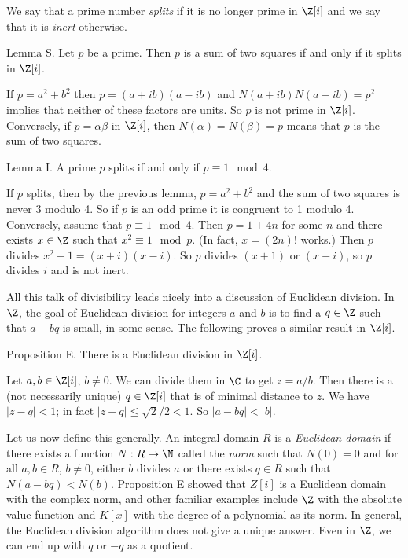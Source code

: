 We say that a prime number {\it splits} if it is no longer prime in $\Z[i]$ and we say that it is {\it inert} otherwise.

\proclaim Lemma S. Let $p$ be a prime. Then $p$ is a sum of two squares if and only if it splits in $\Z[i]$.

\proof If $p = a^2 + b^2$ then $p = (a + ib)(a-ib)$ and $N(a+ib)N(a-ib) = p^2$ implies that neither of these factors are units. So $p$ is not prime in $\Z[i]$. Conversely, if $p = \alpha\beta$ in $\Z[i]$, then $N(\alpha) = N(\beta) = p$ means that $p$ is the sum of two squares.\slug

\proclaim Lemma I. A prime $p$ splits if and only if $p\equiv 1 \mod 4$.

\proof If $p$ splits, then by the previous lemma, $p = a^2 + b^2$ and the sum of two squares is never $3$ modulo 4. So if $p$ is an odd prime it is congruent to 1 modulo 4. Conversely, assume that $p\equiv 1\mod 4$. Then $p = 1 + 4n$ for some $n$ and there exists $x\in \Z$ such that $x^2 \equiv 1\mod p$. (In fact, $x = (2n)!$ works.) Then $p$ divides $x^2 + 1 = (x+i)(x-i)$. So $p$ divides $(x+1)$ or $(x-i)$, so $p$ divides $i$ and is not inert.\slug

All this talk of divisibility leads nicely into a discussion of Euclidean division. In $\Z$, the goal of Euclidean division for integers $a$ and $b$ is to find a $q\in \Z$ such that $a-bq$ is small, in some sense. The following proves a similar result in $\Z[i]$.

\proclaim Proposition E. There is a Euclidean division in $\Z[i]$.

\proof Let $a,b\in \Z[i]$, $b\neq 0$. We can divide them in $\C$ to get $z = a/b$. Then there is a (not necessarily unique) $q\in \Z[i]$ that is of minimal distance to $z$. We have $|z-q|<1$; in fact $|z-q| \leq \sqrt{2}/2 < 1$. So $|a-bq| < |b|$.\slug

Let us now define this generally. An integral domain $R$ is a {\it Euclidean domain} if there exists a function $N : R\to \N$ called the {\it norm} such that $N(0) = 0$ and for all $a,b\in R$, $b\neq 0$, either $b$ divides $a$ or there exists $q\in R$ such that $N(a-bq) < N(b)$. Proposition E showed that $Z[i]$ is a Euclidean domain with the complex norm, and other familiar examples include $\Z$ with the absolute value function and $K[x]$ with the degree of a polynomial as its norm. In general, the Euclidean division algorithm does not give a unique answer. Even in $\Z$, we can end up with $q$ or $-q$ as a quotient.

